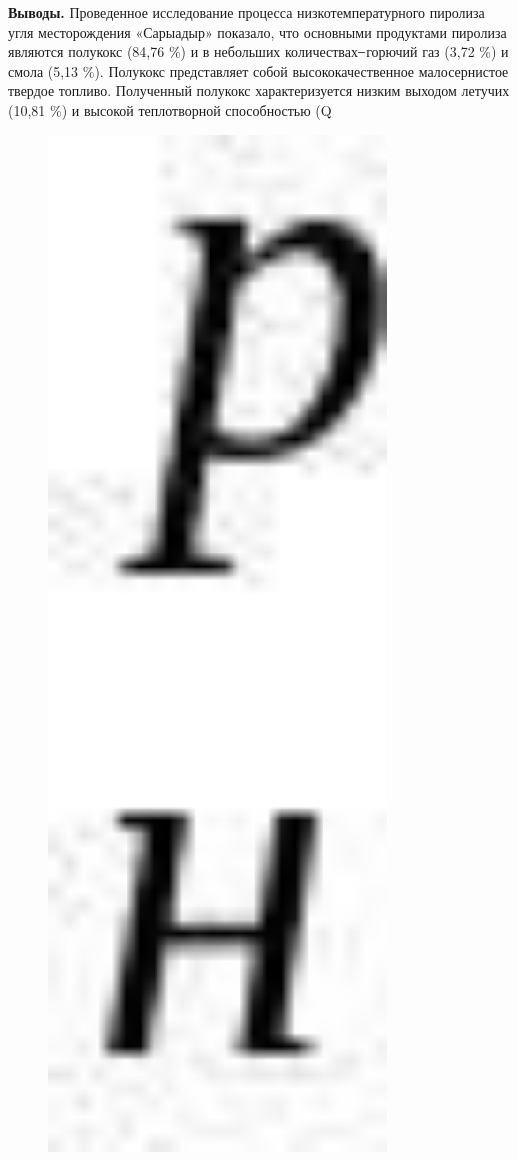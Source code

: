 {\bfseries Выводы.} Проведенное исследование процесса низкотемпературного
пиролиза угля месторождения «Сарыадыр» показало, что основными
продуктами пиролиза являются полукокс (84,76 \%) и в небольших
количествах ̶ горючий газ (3,72 \%) и смола (5,13 \%). Полукокс
представляет собой высококачественное малосернистое твердое топливо.
Полученный полукокс характеризуется низким выходом летучих (10,81 \%) и
высокой теплотворной способностью (Q\begin{figure}[H]
	\centering
	\includegraphics[width=0.8\textwidth]{assets/67}
	\caption*{}
\end{figure}
